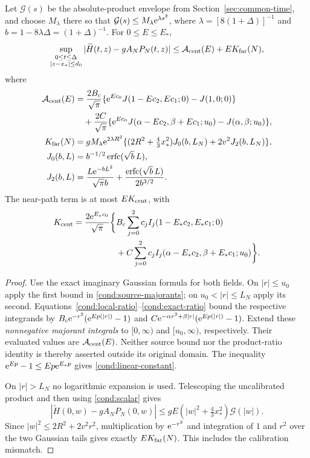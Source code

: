 \begin{proposition}\label{cond:path}
Let $\mathcal G(s)$ be the absolute-product envelope from
Section~\ref{sec:common-time}, and choose $M_\lambda$ there so that
$\mathcal G(s)\le M_\lambda\mathrm e^{\lambda s^2}$, where
$\lambda=[8(1+\Delta)]^{-1}$ and
$b=1-8\lambda\Delta=(1+\Delta)^{-1}$.
For $0\le E\le E_*$,
\begin{equation}
 \sup_{\substack{0\le t\le\Delta\\|z-x_*|\le d_0}}
 |\widetilde H(t,z)-gA_NP_N(t,z)|
 \le \mathcal A_{\rm cent}(E)+E K_{\rm far}(N),
 \label{cond:complete-bound}
\end{equation}
where
\begin{align}
 \mathcal A_{\rm cent}(E)
 &=\frac{2B_c}{\sqrt\pi}
      \{\mathrm e^{Ec_0}J(1-Ec_2,Ec_1;0)-J(1,0;0)\}\notag\\
 &\quad+\frac{2C}{\sqrt\pi}
      \{\mathrm e^{Ec_0}J(\alpha-Ec_2,\beta+Ec_1;u_0)
                        -J(\alpha,\beta;u_0)\},\notag\\
 K_{\rm far}(N)
 &=gM_\lambda\mathrm e^{2\lambda R^2}
   \{(2R^2+\tfrac43x_*^2)J_0(b,L_N)+2v^2J_2(b,L_N)\},\notag\\
 J_0(b,L)&=b^{-1/2}\operatorname{erfc}(\sqrt b\,L),\notag\\
 J_2(b,L)&=\frac{L\mathrm e^{-bL^2}}{\sqrt\pi b}
            +\frac{\operatorname{erfc}(\sqrt b\,L)}{2b^{3/2}} .
 \label{cond:complete-constants}
\end{align}
The near-path term is at most $E K_{\rm cent}$, with
\begin{align}
 K_{\rm cent}
 =\frac{2\mathrm e^{E_*c_0}}{\sqrt\pi}\bigg\{&
 B_c\sum_{j=0}^2 c_j I_j(1-E_*c_2,E_*c_1;0)\notag\\
 &+C\sum_{j=0}^2 c_j
       I_j(\alpha-E_*c_2,\beta+E_*c_1;u_0)\bigg\}.
 \label{cond:linear-constant}
\end{align}
\end{proposition}

\begin{proof}
Use the exact imaginary Gaussian formula for both fields.
On $|r|\le u_0$ apply the first bound in
\eqref{cond:source-majorants}; on $u_0<|r|\le L_N$ apply its second.
Equations~\eqref{cond:local-ratio}--\eqref{cond:exact-ratio} bound the
respective integrands by
$B_c\mathrm e^{-r^2}(\mathrm e^{Ep(|r|)}-1)$ and
$C\mathrm e^{-\alpha r^2+\beta|r|}(\mathrm e^{Ep(|r|)}-1)$.
Extend these \emph{nonnegative majorant integrals} to $[0,\infty)$
and $[u_0,\infty)$, respectively. Their evaluated values are
$\mathcal A_{\rm cent}(E)$. Neither source bound nor the product-ratio
identity is thereby asserted outside its original domain.
The inequality $\mathrm e^{Ep}-1\le Ep\mathrm e^{E_*p}$ gives
\eqref{cond:linear-constant}.

On $|r|>L_N$ no logarithmic expansion is used. Telescoping the
uncalibrated product and then using \eqref{cond:scalar} gives
\[
 |\widetilde H(0,w)-gA_NP_N(0,w)|
 \le gE(|w|^2+\tfrac43x_*^2)\mathcal G(|w|).
\]
Since $|w|^2\le2R^2+2v^2r^2$, multiplication by $\mathrm e^{-r^2}$
and integration of $1$ and $r^2$ over the two Gaussian tails gives
exactly $E K_{\rm far}(N)$. This includes the calibration mismatch.
\end{proof}

